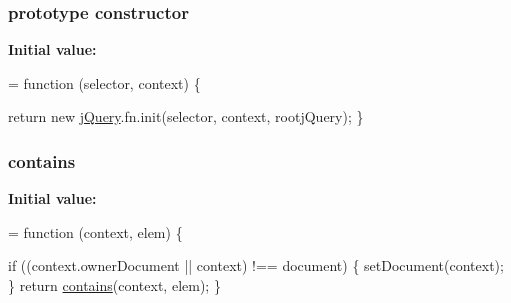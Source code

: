 \subsubsection[{\texorpdfstring{constructor}{constructor}}]{ {\bf prototype} constructor}\hypertarget{jquery-2_82_81-vsdoc_8js_ac8c7ab4467fc25f40e85c72221a1f10b}{}\label{jquery-2_82_81-vsdoc_8js_ac8c7ab4467fc25f40e85c72221a1f10b}
{\bfseries Initial value\+:}
\begin{DoxyCode}
= \textcolor{keyword}{function} (selector, context) \{

        
        \textcolor{keywordflow}{return} \textcolor{keyword}{new} \hyperlink{jquery-2_82_81-vsdoc_8js_add5237586d970a38a81f990e8eb28c6c}{jQuery}.fn.init(selector, context, rootjQuery);
    \}
\end{DoxyCode}
\subsubsection[{\texorpdfstring{contains}{contains}}]{ contains}\hypertarget{jquery-2_82_81-vsdoc_8js_ac28d955147e97e41b2a7cd70f91ab219}{}\label{jquery-2_82_81-vsdoc_8js_ac28d955147e97e41b2a7cd70f91ab219}
{\bfseries Initial value\+:}
\begin{DoxyCode}
= \textcolor{keyword}{function} (context, elem) \{
        

        
        \textcolor{keywordflow}{if} ((context.ownerDocument || context) !== document) \{
            setDocument(context);
        \}
        \textcolor{keywordflow}{return} \hyperlink{jquery-2_82_81-vsdoc_8js_ac28d955147e97e41b2a7cd70f91ab219}{contains}(context, elem);
    \}
\end{DoxyCode}
